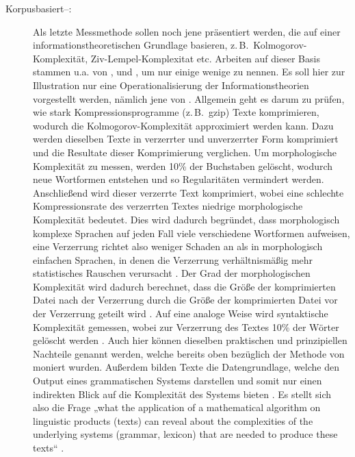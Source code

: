 \begin{exe}
\begin{exe}
\begin{description}
\item[Korpusbasiert--:] Als letzte Messmethode sollen noch jene präsentiert werden, die auf einer informationstheoretischen Grundlage basieren, z.\,B.\ Kolmogorov-Komplexität, Ziv-Lempel-Komplexitat etc. Arbeiten auf dieser Basis stammen u.a. von \citet{Juola2008}, \citet{Bane2008} und \citet{EhretSzmrecsanyi2016}, um nur einige wenige zu nennen. Es soll hier zur Illustration nur eine Operationalisierung der Informationstheorien vorgestellt werden, nämlich jene von \citet{EhretSzmrecsanyi2016}. Allgemein geht es darum zu prüfen, wie stark Kompressionsprogramme (z.\,B.\ gzip) Texte komprimieren, wodurch die Kolmogorov-Komplexität approximiert werden kann. Dazu werden dieselben Texte in verzerrter und unverzerrter Form komprimiert und die Resultate dieser Komprimierung verglichen. Um morphologische Komplexität zu messen, werden 10\% der Buchstaben gelöscht, wodurch neue Wortformen entstehen und so Regularitäten vermindert werden. Anschließend wird dieser verzerrte Text komprimiert, wobei eine schlechte Kompressionsrate des verzerrten Textes niedrige morphologische Komplexität bedeutet. Dies wird dadurch begründet, dass morphologisch komplexe Sprachen auf jeden Fall viele verschiedene Wortformen aufweisen, eine Verzerrung richtet also weniger Schaden an als in morphologisch einfachen Sprachen, in denen die Verzerrung verhältnismäßig mehr statistisches Rauschen verursacht \citep[75–76]{EhretSzmrecsanyi2016}. Der Grad der morphologischen Komplexität wird dadurch berechnet, dass die Größe der komprimierten Datei nach der Verzerrung durch die Größe der komprimierten Datei vor der Verzerrung geteilt wird \citep[76]{EhretSzmrecsanyi2016}. Auf eine analoge Weise wird syntaktische Komplexität gemessen, wobei zur Verzerrung des Textes 10\% der Wörter gelöscht werden \citep[76]{EhretSzmrecsanyi2016}. Auch hier können dieselben praktischen und prinzipiellen Nachteile genannt werden, welche bereits oben bezüglich der Methode von \citet{SzmrecsanyiKortmann2009} moniert wurden. Außerdem bilden Texte die Datengrundlage, welche den Output eines grammatischen Systems darstellen und somit nur einen indirekten Blick auf die Komplexität des Systems bieten \citep[19]{Sinnemäki2011}. Es stellt sich also die Frage „what the application of a mathematical algorithm on linguistic products (texts) can reveal about the complexities of the underlying systems (grammar, lexicon) that are needed to produce these texts“ \citep[28]{Miestamo2008}.\\


\end{description}
\end{exe}
\end{exe}
